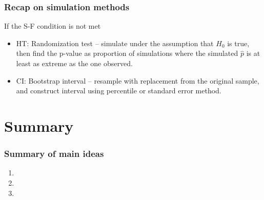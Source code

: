 \documentclass[slidestop,compress,mathserif,12pt,t,professionalfonts,xcolor=table]{beamer}
\begin{document}
\begin{frame}
\frametitle{Recap on simulation methods}

If the S-F condition is not met

\begin{itemize}

\item HT: Randomization test -- simulate under the assumption that $H_0$ is true, then find the p-value as 
proportion of simulations where the simulated $\hat{p}$ is at least as extreme as the one observed.

\item CI: Bootstrap interval -- resample with replacement from the original sample, and construct interval 
using percentile or standard error method.

\end{itemize}


\end{frame}


\section{Summary}


\begin{frame}
\frametitle{Summary of main ideas}

\vfill

\begin{enumerate}

\item {}

\item {}

\item {}

\end{enumerate}

\vfill

\end{frame}

\end{document}
